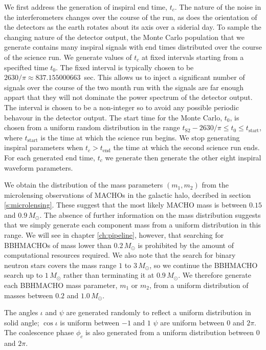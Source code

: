 We first address the generation of inspiral end time, $t_c$. The nature of the
noise in the interferometers changes over the course of the run, as does the
orientation of the detectors as the earth rotates about its axis over a
siderial day. To sample the changing nature of the detector output, the Monte
Carlo population that we generate contains many inspiral signals with end
times distributed over the course of the science run. We generate values of
$t_c$ at fixed intervals starting from a specifted time $t_0$. The fixed
interval is typically chosen to be $2630/\pi \approx 837.155000663$~sec. This
allows us to inject a significant number of signals over the course of the two
month run with the signals are far enough appart that they will not dominate
the power spectrum of the detector output. The interval is chosen to be a
non-integer so to avoid any possible periodic behavour in the detector output.
The start time for the Monte Carlo, $t_0$, is chosen from a uniform random
distribution in the range $t_\mathrm{S2} - 2630/\pi \le t_0 \le
t_\mathrm{start}$, where $t_\mathrm{start}$ is the time at which the science
run begins. We stop generating inspiral parameters when $t_c > t_\mathrm{end}$
the time at which the second science run ends. For each generated end time,
$t_c$ we generate then generate the other eight inspiral waveform parameters.

We obtain the distribution of the mass parameters $(m_1,m_2)$ from the
microlensing observations of MACHOs in the galactic halo, decribed in section
\ref{s:microlensing}. These suggest that the most likely MACHO mass is between
$0.15$ and $0.9\,M_\odot$. The absence of further information on the mass
distribution suggests that we simply generate each component mass from a
uniform distribution in this range. We will see in chapter \ref{ch:pipeline},
however, that searching for BBHMACHOs of mass lower than $0.2\,M_\odot$ is
prohibited by the amount of computational resources required. We also note
that the search for binary neutron stars covers the mass range $1$ to
$3\,M_\odot$, so we continue the BBHMACHO search up to $1\,M_\odot$ rather
than terminating it at $0.9\,M_\odot$. We therefore generate each BBHMACHO
mass parameter, $m_1$ or $m_2$, from a uniform distribution of masses between
$0.2$ and $1.0\,M_\odot$.

The angles $\iota$ and  $\psi$ are generated randomly to reflect a
uniform distribution in solid angle; $\cos \iota$ is uniform between $-1$ and
$1$ $\psi$ are uniform between $0$ and $2\pi$. The coalescence phase $\phi_c$
is also generated from a uniform distribution between $0$ and $2\pi$.

